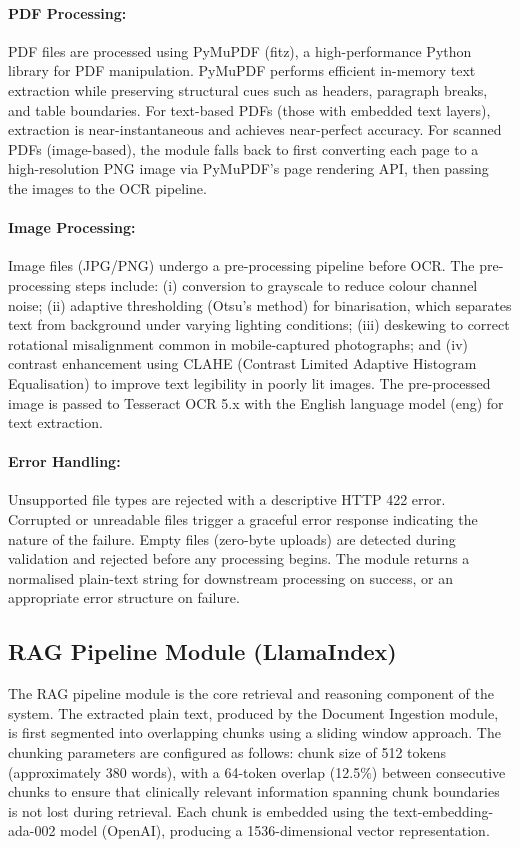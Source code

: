 \documentclass[12pt,a4paper]{report}
\begin{document}
\paragraph{PDF Processing:}
PDF files are processed using PyMuPDF (fitz), a high-performance Python library for PDF manipulation. PyMuPDF performs efficient in-memory text extraction while preserving structural cues such as headers, paragraph breaks, and table boundaries. For text-based PDFs (those with embedded text layers), extraction is near-instantaneous and achieves near-perfect accuracy. For scanned PDFs (image-based), the module falls back to first converting each page to a high-resolution PNG image via PyMuPDF's page rendering API, then passing the images to the OCR pipeline.

\paragraph{Image Processing:}
Image files (JPG/PNG) undergo a pre-processing pipeline before OCR. The pre-processing steps include: (i) conversion to grayscale to reduce colour channel noise; (ii) adaptive thresholding (Otsu's method) for binarisation, which separates text from background under varying lighting conditions; (iii) deskewing to correct rotational misalignment common in mobile-captured photographs; and (iv) contrast enhancement using CLAHE (Contrast Limited Adaptive Histogram Equalisation) to improve text legibility in poorly lit images. The pre-processed image is passed to Tesseract OCR 5.x with the English language model (eng) for text extraction.

\paragraph{Error Handling:}
Unsupported file types are rejected with a descriptive HTTP 422 error. Corrupted or unreadable files trigger a graceful error response indicating the nature of the failure. Empty files (zero-byte uploads) are detected during validation and rejected before any processing begins. The module returns a normalised plain-text string for downstream processing on success, or an appropriate error structure on failure.

\subsection{RAG Pipeline Module (LlamaIndex)}
The RAG pipeline module is the core retrieval and reasoning component of the system. The extracted plain text, produced by the Document Ingestion module, is first segmented into overlapping chunks using a sliding window approach. The chunking parameters are configured as follows: chunk size of 512 tokens (approximately 380 words), with a 64-token overlap (12.5\%) between consecutive chunks to ensure that clinically relevant information spanning chunk boundaries is not lost during retrieval. Each chunk is embedded using the text-embedding-ada-002 model (OpenAI), producing a 1536-dimensional vector representation.
\end{document}
